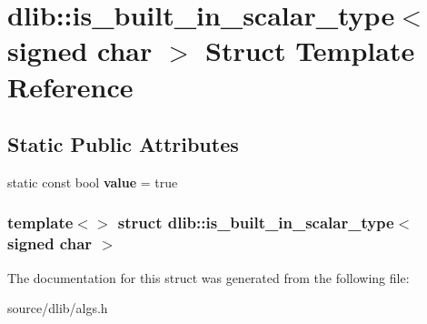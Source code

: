 \hypertarget{structdlib_1_1is__built__in__scalar__type_3_01signed_01char_01_4}{
\section{dlib::is\_\-built\_\-in\_\-scalar\_\-type$<$ signed char $>$ Struct Template Reference}
\label{structdlib_1_1is__built__in__scalar__type_3_01signed_01char_01_4}
}
\subsection*{Static Public Attributes}
\begin{DoxyCompactItemize}
\item 
\hypertarget{structdlib_1_1is__built__in__scalar__type_3_01signed_01char_01_4_ab9e5755879587c595c64c68ade6c96e2}{
static const bool {\bfseries value} = true}
\label{structdlib_1_1is__built__in__scalar__type_3_01signed_01char_01_4_ab9e5755879587c595c64c68ade6c96e2}

\end{DoxyCompactItemize}
\subsubsection*{template$<$$>$ struct dlib::is\_\-built\_\-in\_\-scalar\_\-type$<$ signed char $>$}



The documentation for this struct was generated from the following file:\begin{DoxyCompactItemize}
\item 
source/dlib/algs.h\end{DoxyCompactItemize}
